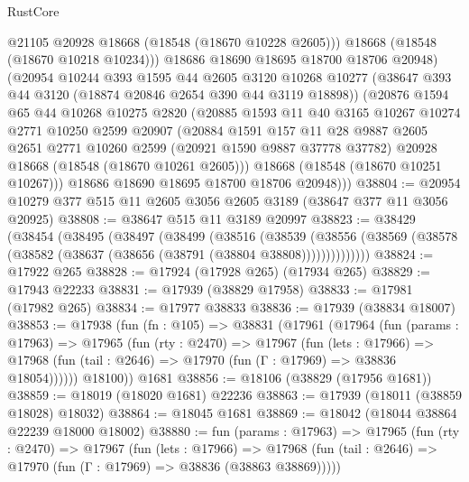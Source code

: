 \begin{lexlean}{RustCore}
\begin{coremodule}
            @21105
            @20928
            @18668
            (@18548 (@18670 @10228 @2605)))
          @18668
          (@18548 (@18670 @10218 @10234)))
        @18686
        @18690
        @18695
        @18700
        @18706
        @20948)
      (@20954
        @10244
        @393
        @1595
        @44
        @2605
        @3120
        @10268
        @10277
        (@38647 @393 @44 @3120 (@18874 @20846 @2654 @390 @44 @3119 @18898))
        (@20876
          @1594
          @65
          @44
          @10268
          @10275
          @2820
          (@20885
            @1593
            @11
            @40
            @3165
            @10267
            @10274
            @2771
            @10250
            @2599
            @20907
            (@20884
              @1591
              @157
              @11
              @28
              @9887
              @2605
              @2651
              @2771
              @10260
              @2599
              (@20921 @1590 @9887 @37778 @37782)
              @20928
              @18668
              (@18548 (@18670 @10261 @2605)))
            @18668
            (@18548 (@18670 @10251 @10267)))
          @18686
          @18690
          @18695
          @18700
          @18706
          @20948)))
@38804 := @20954 @10279 @377 @515 @11 @2605 @3056 @2605 @3189 (@38647 @377 @11 @3056 @20925)
@38808 := @38647 @515 @11 @3189 @20997
@38823 := @38429
    (@38454
      (@38495
        (@38497
          (@38499
            (@38516
              (@38539
                (@38556 (@38569 (@38578 (@38582 (@38637 (@38656 (@38791 (@38804 @38808))))))))))))))
@38824 := @17922 @265
@38828 := @17924 (@17928 @265) (@17934 @265)
@38829 := @17943 @22233
@38831 := @17939 (@38829 @17958)
@38833 := @17981 (@17982 @265)
@38834 := @17977 @38833
@38836 := @17939 (@38834 @18007)
@38853 := @17938
    (fun (fn : @105) =>
    @38831
      (@17961
        (@17964
          (fun (params : @17963) =>
          @17965
            (fun (rty : @2470) =>
            @17967
              (fun (lets : @17966) =>
              @17968 (fun (tail : @2646) => @17970 (fun (Γ : @17969) => @38836 @18054))))))
        @18100))
    @1681
@38856 := @18106 (@38829 (@17956 @1681))
@38859 := @18019 (@18020 @1681) @22236
@38863 := @17939 (@18011 (@38859 @18028) @18032)
@38864 := @18045 @1681
@38869 := @18042 (@18044 @38864 @22239 @18000 @18002)
@38880 := fun (params : @17963) =>
  @17965
    (fun (rty : @2470) =>
    @17967
      (fun (lets : @17966) =>
      @17968 (fun (tail : @2646) => @17970 (fun (Γ : @17969) => @38836 (@38863 @38869)))))

\end{coremodule}
\end{lexlean}
